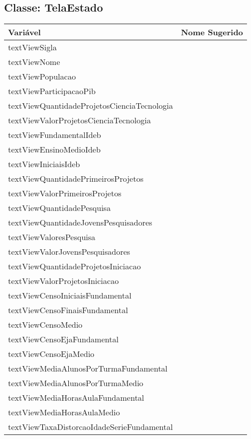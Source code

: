 \documentclass[12pt]{article}
\begin{document}
	\subsection{Classe: TelaEstado}
		\begin{table}[H]
			\begin{center}
				\begin{tabular}{l | l}
					\toprule
						Variável & Nome Sugerido\\
					\midrule
						textViewSigla & \\
						textViewNome & \\
						textViewPopulacao & \\
						textViewParticipacaoPib & \\
						textViewQuantidadeProjetosCienciaTecnologia & \\
						textViewValorProjetosCienciaTecnologia & \\
						textViewFundamentalIdeb & \\
						textViewEnsinoMedioIdeb & \\
						textViewIniciaisIdeb & \\
						textViewQuantidadePrimeirosProjetos & \\
						textViewValorPrimeirosProjetos & \\
						textViewQuantidadePesquisa & \\
						textViewQuantidadeJovensPesquisadores & \\
						textViewValoresPesquisa & \\
						textViewValorJovensPesquisadores & \\
						textViewQuantidadeProjetosIniciacao & \\
						textViewValorProjetosIniciacao & \\
						textViewCensoIniciaisFundamental & \\
						textViewCensoFinaisFundamental & \\
						textViewCensoMedio & \\
						textViewCensoEjaFundamental & \\
						textViewCensoEjaMedio & \\
						textViewMediaAlunosPorTurmaFundamental & \\
						textViewMediaAlunosPorTurmaMedio & \\
						textViewMediaHorasAulaFundamental & \\
						textViewMediaHorasAulaMedio & \\
						textViewTaxaDistorcaoIdadeSerieFundamental & \\

\end{tabular}
\end{center}
\end{table}
\end{document}

